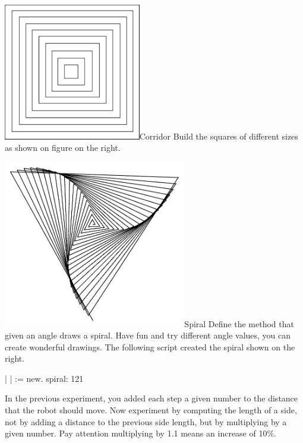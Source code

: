 \begin{exofigwithsizeandtitle}[0.5]{\includegraphics[width=6cm]{corridor}}{Corridor}\label{exo:corridorsimple2}
Build the squares of different sizes as shown on figure on the right.
\end{exofigwithsizeandtitle}



\begin{exofigwithsizeandtitle}[0.35]{\includegraphics[width=8cm]{varLoopsSpiral121}}{Spiral}\label{exo:spiral}
Define the method  that given an angle draws a
spiral. Have fun and try different angle values, you can create
wonderful drawings.  The following script created the spiral shown on the right.
\begin{nalltt}
| \caro |
\caro := \Turtle new.
\caro spiral: 121
\end{nalltt}
\end{exofigwithsizeandtitle}

\begin{exonofig}
In the previous experiment,  you added each step a given number to the distance that the robot should move. Now experiment by computing the length of a side, not by adding a distance to the previous side length, but by multiplying by a given number. Pay
attention multiplying by 1.1 means an increase of 10\%.
\end{exonofig}


